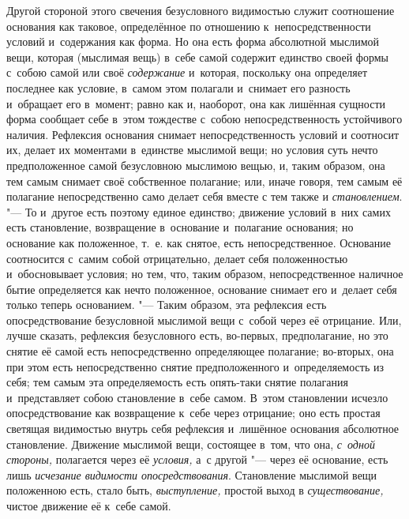Другой стороной этого свечения безусловного видимостью служит соотношение
основания как таковое, определённое по отношению к~непосредственности
условий и~содержания как форма. Но она есть форма абсолютной мыслимой вещи,
которая (мыслимая вещь) в~себе самой содержит единство своей формы с~собою
самой или своё {\em содержание} и~которая, поскольку
она определяет последнее как условие, в~самом этом полагали и~снимает его
разность и~обращает его в~момент; равно как и, наоборот, она как лишённая
сущности форма сообщает себе в~этом тождестве с~собою непосредственность
устойчивого наличия. Рефлексия основания снимает непосредственность условий
и соотносит их, делает их моментами в~единстве мыслимой вещи; но условия
суть нечто предположенное самой безусловною мыслимою вещью, и, таким
образом, она тем самым снимает своё собственное полагание; или, иначе
говоря, тем самым её полагание непосредственно само делает себя вместе с
тем также и {\em становлением}. "--- То и~другое есть
поэтому единое единство; движение условий в~них самих есть становление,
возвращение в~основание и~полагание основания; но основание как положенное,
т.~е. как снятое, есть непосредственное. Основание соотносится с~самим
собой отрицательно, делает себя положенностью и~обосновывает условия; но
тем, что, таким образом, непосредственное наличное бытие определяется как
нечто положенное, основание снимает его и~делает себя только теперь
основанием. "--- Таким образом, эта рефлексия есть опосредствование
безусловной мыслимой вещи с~собой через её отрицание. Или, лучше сказать,
рефлексия безусловного есть, во-первых, предполагание, но это снятие её
самой есть непосредственно определяющее полагание; во-вторых, она при этом
есть непосредственно снятие предположенного и~определяемость из себя; тем
самым эта определяемость есть опять-таки снятие полагания и~представляет
собою становление в~себе самом. В~этом становлении исчезло опосредствование
как возвращение к~себе через отрицание; оно есть простая светящая
видимостью внутрь себя рефлексия и~лишённое основания абсолютное
становление. Движение мыслимой вещи, состоящее в~том, что она,
{\em с~одной стороны,} полагается через её
{\em условия,} а~с другой "--- через её основание, есть
лишь {\em исчезание видимости опосредствования}.
Становление мыслимой вещи положенною есть, стало быть,
{\em выступление,} простой выход в
{\em существование,} чистое движение её к~себе самой.


